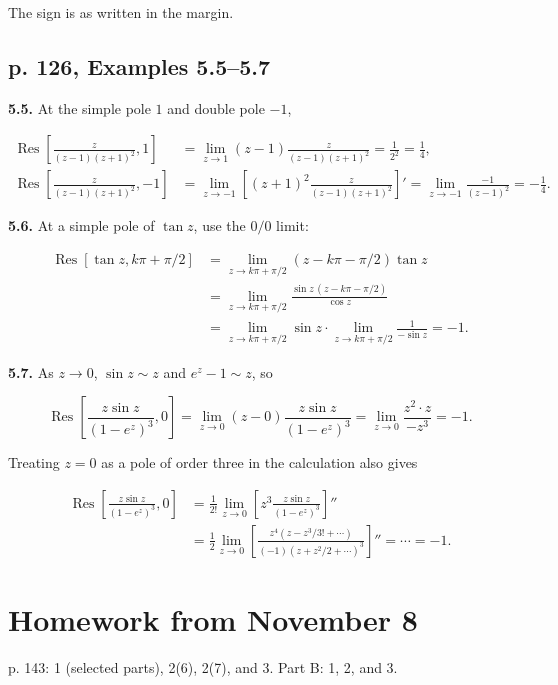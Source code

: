 \documentclass[11pt,a4paper]{article}
\theoremstyle{definition}
\theoremstyle{plain}
\begin{document}
The sign is as written in the margin.


\subsection{p. 126, Examples 5.5--5.7}

\textbf{5.5.} At the simple pole $1$ and double pole $-1$,

\[
\begin{aligned}
\operatorname{Res}\left[\frac z{(z-1)(z+1)^2},1\right]
&=\lim_{z\to1}(z-1)\frac z{(z-1)(z+1)^2}
=\frac1{2^2}=\frac14,\\
\operatorname{Res}\left[\frac z{(z-1)(z+1)^2},-1\right]
&=\lim_{z\to-1}\left[(z+1)^2\frac z{(z-1)(z+1)^2}\right]'
=\lim_{z\to-1}\frac{-1}{(z-1)^2}=-\frac14.
\end{aligned}
\]

\textbf{5.6.} At a simple pole of $\tan z$, use the $0/0$ limit:

\[
\begin{aligned}
\operatorname{Res}[\tan z,k\pi+\pi/2]
&=\lim_{z\to k\pi+\pi/2}(z-k\pi-\pi/2)\tan z\\
&=\lim_{z\to k\pi+\pi/2}\frac{\sin z\,(z-k\pi-\pi/2)}{\cos z}\\
&=\lim_{z\to k\pi+\pi/2}\sin z\cdot
\lim_{z\to k\pi+\pi/2}\frac1{-\sin z}=-1.
\end{aligned}
\]

\textbf{5.7.} As $z\to0$, $\sin z\sim z$ and $e^z-1\sim z$, so

\[
\operatorname{Res}\left[\frac{z\sin z}{(1-e^z)^3},0\right]
=\lim_{z\to0}(z-0)\frac{z\sin z}{(1-e^z)^3}
=\lim_{z\to0}\frac{z^2\cdot z}{-z^3}=-1.
\]

Treating $z=0$ as a pole of order three in the calculation also gives

\[
\begin{aligned}
\operatorname{Res}\left[\frac{z\sin z}{(1-e^z)^3},0\right]
&=\frac1{2!}\lim_{z\to0}\left[z^3\frac{z\sin z}{(1-e^z)^3}\right]''\\
&=\frac12\lim_{z\to0}
\left[\frac{z^4(z-z^3/3!+\cdots)}{(-1)(z+z^2/2+\cdots)^3}\right]''
=\cdots=-1.
\end{aligned}
\]


\section{Homework from November 8}

p. 143: 1 (selected parts), 2(6), 2(7), and 3. Part B: 1, 2, and 3.
\end{document}
